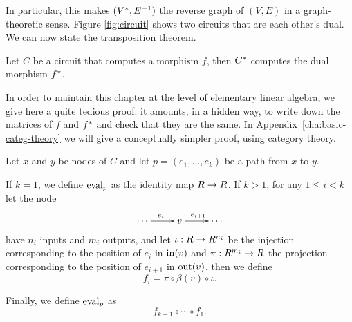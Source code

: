 In particular, this makes $(V^\ast,E^{-1})$ the reverse graph of
$(V,E)$ in a graph-theoretic sense. Figure \ref{fig:circuit} shows two
circuits that are each other's dual. We can now state the
transposition theorem.

\begin{theorem}
  \label{th:tellegen}
  Let $C$ be a circuit that computes a morphism $f$, then $C^\ast$
  computes the dual morphism $f^\ast$.
\end{theorem}

  In order to
maintain this chapter at the level of elementary linear algebra, we
give here a quite tedious proof: it amounts, in a hidden way, to write
down the matrices of $f$ and $f^\ast$ and check that they are the
same. In Appendix~\ref{cha:basic-categ-theory} we will give a
conceptually simpler proof, using category theory.

\begin{definition}
  Let $x$ and $y$ be nodes of $C$ and let $p=(e_1,\ldots,e_k)$ be a
  path from $x$ to $y$.

  If $k=1$, we define $\operatorname{eval}_p$ as the identity map $R\rightarrow R$. If
  $k>1$, for any $1\le i<k$ let the node
  \[\xymatrix{\cdots\ar[r]^{e_i}&v\ar[r]^{e_{i+1}}&\cdots}\]
  have $n_i$ inputs and $m_i$ outputs, and let $\iota:R\rightarrow R^{n_i}$ be
  the injection corresponding to the position of $e_i$ in $\operatorname{in}(v)$
  and $\pi:R^{m_i}\rightarrow R$ the projection corresponding to the position
  of $e_{i+1}$ in $\operatorname{out}(v)$, then we define
  \begin{equation}
    \label{eq:252}
    f_i = \pi\circ\beta(v)\circ\iota
    \text{.}
  \end{equation}

  Finally, we define $\operatorname{eval}_p$ as
  \begin{equation}
    \label{eq:247}
    f_{k-1}\circ\cdots\circ f_1
    \text{.}
  \end{equation}
\end{definition}

